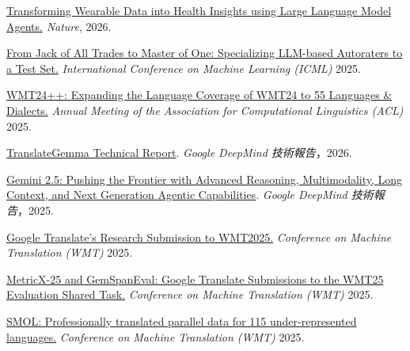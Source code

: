 
\href{https://www.nature.com/articles/s41467-025-67922-y_reference.pdf}{Transforming Wearable Data into Health Insights using Large Language Model Agents.} \emph{Nature}, 2026.

\href{https://openreview.net/pdf?id=Y0Kxvmjkmh}{From Jack of All Trades to Master of One: Specializing LLM-based Autoraters to a Test Set.} \emph{International Conference on Machine Learning (ICML)} 2025.

\href{https://aclanthology.org/2025.findings-acl.634.pdf}{WMT24++: Expanding the Language Coverage of WMT24 to 55 Languages \& Dialects.} \emph{Annual Meeting of the Association for Computational Linguistics (ACL)} 2025.

\href{https://arxiv.org/pdf/2601.09012}{TranslateGemma Technical Report}. \emph{Google DeepMind 技術報告}，2026.

\href{https://arxiv.org/pdf/2507.06261}{Gemini 2.5: Pushing the Frontier with Advanced Reasoning, Multimodality, Long Context, and Next Generation Agentic Capabilities}. \emph{Google DeepMind 技術報告}，2025.

\href{https://aclanthology.org/2025.wmt-1.48.pdf}{Google Translate’s Research Submission to WMT2025.} \emph{Conference on Machine Translation (WMT)} 2025.

\href{https://aclanthology.org/2025.wmt-1.70.pdf}{MetricX-25 and GemSpanEval: Google Translate Submissions to the WMT25 Evaluation Shared Task.} \emph{Conference on Machine Translation (WMT)} 2025.

\href{https://aclanthology.org/2025.wmt-1.85.pdf}{SMOL: Professionally translated parallel data for 115 under-represented languages.} \emph{Conference on Machine Translation (WMT)} 2025.

